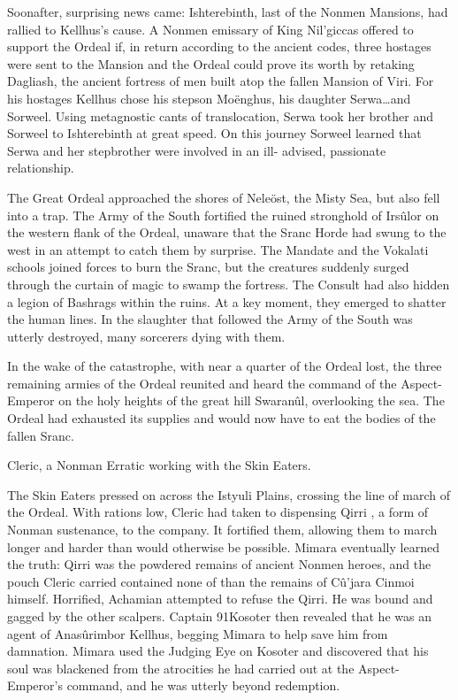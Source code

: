 \documentclass[]{book}
\begin{document}
Soonafter, surprising news came: Ishterebinth, last of the Nonmen Mansions, had
rallied to Kellhus's cause. A Nonmen emissary of King Nil'giccas offered to support the
Ordeal if, in return according to the ancient codes, three hostages were sent to the
Mansion and the Ordeal could prove its worth by retaking Dagliash, the ancient
fortress of men built atop the fallen Mansion of Viri. For his hostages Kellhus chose his
stepson Moënghus, his daughter Serwa\ldots{}and Sorweel. Using metagnostic cants of
translocation, Serwa took her brother and Sorweel to Ishterebinth at great speed. On
this journey Sorweel learned that Serwa and her stepbrother were involved in an ill-
advised, passionate relationship.

The Great Ordeal approached the shores of Neleöst, the Misty Sea, but also fell into a
trap. The Army of the South fortified the ruined stronghold of Irsûlor on the western
flank of the Ordeal, unaware that the Sranc Horde had swung to the west in an attempt
to catch them by surprise. The Mandate and the Vokalati schools joined forces to burn
the Sranc, but the creatures suddenly surged through the curtain of magic to swamp the
fortress. The Consult had also hidden a legion of Bashrags within the ruins. At a key
moment, they emerged to shatter the human lines. In the slaughter that followed the
Army of the South was utterly destroyed, many sorcerers dying with them.

In the wake of the catastrophe, with near a quarter of the Ordeal lost, the three
remaining armies of the Ordeal reunited and heard the command of the Aspect-Emperor on the holy heights of the great hill Swaranûl, overlooking the sea. The
Ordeal had exhausted its supplies and would now have to eat the bodies of the fallen
Sranc.

Cleric, a Nonman Erratic working with the Skin Eaters.

The Skin Eaters pressed on across the Istyuli Plains, crossing the line of march of the
Ordeal. With rations low, Cleric had taken to dispensing Qirri , a form of Nonman
sustenance, to the company. It fortified them, allowing them to march longer and
harder than would otherwise be possible. Mimara eventually learned the truth: Qirri
was the powdered remains of ancient Nonmen heroes, and the pouch Cleric carried
contained none of than the remains of Cû'jara Cinmoi himself. Horrified, Achamian
attempted to refuse the Qirri. He was bound and gagged by the other scalpers. Captain
91Kosoter then revealed that he was an agent of Anasûrimbor Kellhus, begging Mimara to
help save him from damnation. Mimara used the Judging Eye on Kosoter and
discovered that his soul was blackened from the atrocities he had carried out at the
Aspect-Emperor's command, and he was utterly beyond redemption.
\end{document}
